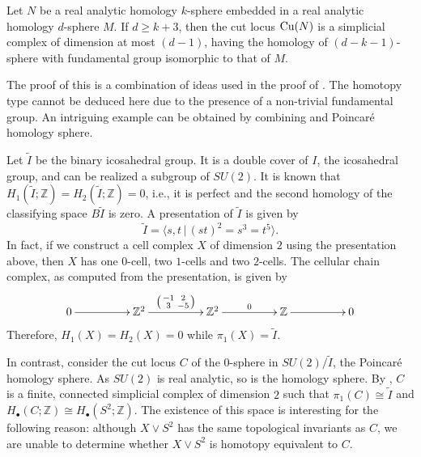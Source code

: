 \begin{prop}\label{homsph2}
    Let $N$ be a real analytic homology $k$-sphere embedded in a real analytic homology $d$-sphere $M$. If $d\geq k+3$, then the cut locus $\mathrm{Cu}(N)$ is a simplicial complex of dimension at most $(d-1)$, having the homology of $(d-k-1)$-sphere with fundamental group isomorphic to that of $M$.
\end{prop}

\vspace{0.3cm}
\noindent The proof of this is a combination of ideas used in the proof of . The homotopy type cannot be deduced here due to the presence of a non-trivial fundamental group. An intriguing example can be obtained by combining  and Poincar\'{e} homology sphere.

\begin{eg}\label{eg: Poincare}
    Let $\tilde{I}$ be the binary icosahedral group. It is a double cover of $I$, the icosahedral group, and can be realized a subgroup of $SU(2)$. It is known that $H_1(\tilde{I};\mathbb{Z})=H_2(\tilde{I};\mathbb{Z})=0$, i.e., it is perfect and the second homology of the classifying space $B\tilde{I}$ is zero. A presentation of $\tilde{I}$ is given by
    \begin{displaymath}
        \tilde{I}=\langle s,t\,|\,(st)^2=s^3=t^5\rangle.
    \end{displaymath}
    In fact, if we construct a cell complex $X$ of dimension $2$ using the presentation above, then $X$ has one $0$-cell, two $1$-cells and two $2$-cells. The cellular chain complex, as computed from the presentation, is given by
    \begin{equation*}
        \xymatrix@R+1pc@C+2pc{
        0\ar[r] & \mathbb{Z}^2\ar[r]^{\spmat{-1 & 2 \\ 3 & -5}} & \mathbb{Z}^2\ar[r]^-{0} & \mathbb{Z}\ar[r] & 0
        }
    \end{equation*}
    Therefore, $H_1(X)=H_2(X)=0$ while $\pi_1(X)=\tilde{I}$. 

    \hf In contrast, consider the cut locus $C$ of the $0$-sphere in $SU(2)/\tilde{I}$, the Poincar\'{e} homology sphere. As $SU(2)$ is real analytic, so is the homology sphere. By , $C$ is a finite, connected simplicial complex of dimension $2$ such that $\pi_1(C)\cong \tilde{I}$ and $H_\bullet(C;\mathbb{Z})\cong H_\bullet(S^2;\mathbb{Z})$. The existence of this space is interesting for the following reason: although $X\vee S^2$ has the same topological invariants as $C$, we are unable to determine whether $X\vee S^2$ is homotopy equivalent to $C$.
\end{eg}
